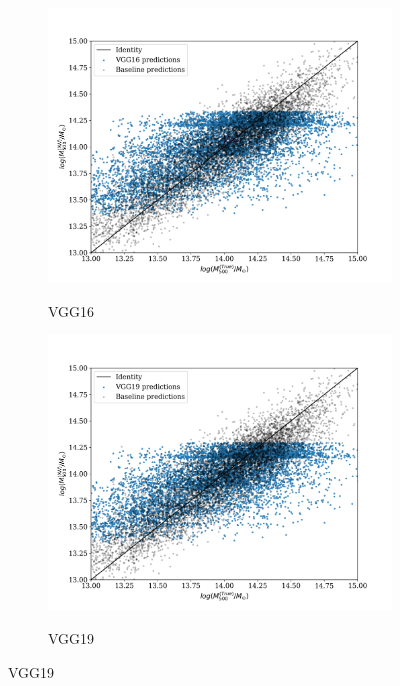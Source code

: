 \begin{figure}[H]
\centering
\begin{subfigure}{.325\textwidth}
    \centering
    \includegraphics[width=\linewidth]{images/Chapter4/Results/training_VGG16_scatter.png}
    \label{fig:training_VGG16_scatter}
    \caption{VGG16}
\end{subfigure}
\begin{subfigure}{.325\textwidth}
    \centering
    \includegraphics[width=\linewidth]{images/Chapter4/Results/training_VGG19_scatter.png}
    \label{fig:training_VGG19_scatter}
    \caption{VGG19}
\end{subfigure}

\end{figure}
